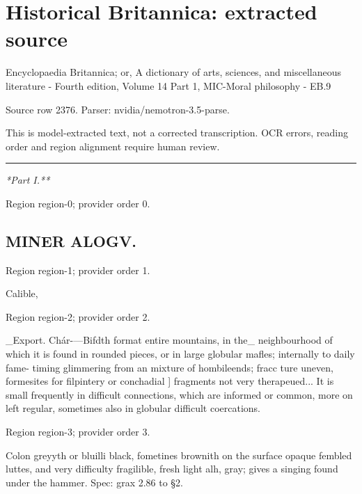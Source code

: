 \documentclass[11pt]{article}
\begin{document}
\section*{Historical Britannica: extracted source}
Encyclopaedia Britannica; or, A dictionary of arts, sciences, and miscellaneous literature - Fourth edition, Volume 14 Part 1, MIC-Moral philosophy - EB.9\par
{\small Source row 2376. Parser: nvidia/nemotron-3.5-parse.\par}
{\small This is model-extracted text, not a corrected transcription. OCR errors, reading order and region alignment require human review.\par}
\hrule\medskip
{\small\itshape **Part I.**\par}

{\scriptsize\color{gray} Region region-0; provider order 0.\par}
\medskip

\subsection*{MINER ALOGV.}

{\scriptsize\color{gray} Region region-1; provider order 1.\par}
\medskip

Calible,
\par

{\scriptsize\color{gray} Region region-2; provider order 2.\par}
\medskip

\_Export. Chár-—Bifdth format entire mountains, in the\_
neighbourhood of which it is found in rounded pieces,
or in large globular mafles; internally to daily fame-
timing glimmering from an mixture of hombileends; fracc
ture uneven, formesites for filpintery or conchadial ]
fragments not very therapeued... It is small frequently
in difficult connections, which are informed or common,
more on left regular, sometimes also in globular difficult
coercations.
\par

{\scriptsize\color{gray} Region region-3; provider order 3.\par}
\medskip

Colon greyyth or bluilli black, fometines brownith
on the surface opaque fembled luttes, and very
difficulty fragilible, fresh light alh, gray; gives a
singing found under the hammer. Spec: grax 2.86
to §2.
\par
\end{document}
